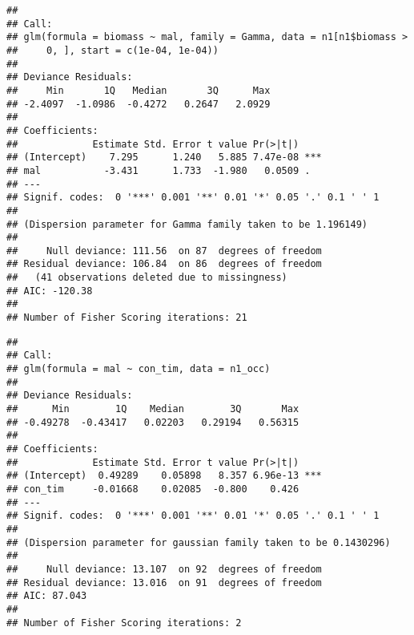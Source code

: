 \documentclass[]{article}
\newenvironment{Shaded}{\begin{snugshade}}{\end{snugshade}}
\newcommand{\KeywordTok}[1]{\textcolor[rgb]{0.13,0.29,0.53}{\textbf{#1}}}
\newcommand{\DataTypeTok}[1]{\textcolor[rgb]{0.13,0.29,0.53}{#1}}
\newcommand{\StringTok}[1]{\textcolor[rgb]{0.31,0.60,0.02}{#1}}
\newcommand{\CommentTok}[1]{\textcolor[rgb]{0.56,0.35,0.01}{\textit{#1}}}
\newcommand{\OperatorTok}[1]{\textcolor[rgb]{0.81,0.36,0.00}{\textbf{#1}}}
\newcommand{\NormalTok}[1]{#1}
\begin{document}
\begin{verbatim}
## 
## Call:
## glm(formula = biomass ~ mal, family = Gamma, data = n1[n1$biomass > 
##     0, ], start = c(1e-04, 1e-04))
## 
## Deviance Residuals: 
##     Min       1Q   Median       3Q      Max  
## -2.4097  -1.0986  -0.4272   0.2647   2.0929  
## 
## Coefficients:
##             Estimate Std. Error t value Pr(>|t|)    
## (Intercept)    7.295      1.240   5.885 7.47e-08 ***
## mal           -3.431      1.733  -1.980   0.0509 .  
## ---
## Signif. codes:  0 '***' 0.001 '**' 0.01 '*' 0.05 '.' 0.1 ' ' 1
## 
## (Dispersion parameter for Gamma family taken to be 1.196149)
## 
##     Null deviance: 111.56  on 87  degrees of freedom
## Residual deviance: 106.84  on 86  degrees of freedom
##   (41 observations deleted due to missingness)
## AIC: -120.38
## 
## Number of Fisher Scoring iterations: 21
\end{verbatim}

\begin{Shaded}
\end{Shaded}

\begin{verbatim}
## 
## Call:
## glm(formula = mal ~ con_tim, data = n1_occ)
## 
## Deviance Residuals: 
##      Min        1Q    Median        3Q       Max  
## -0.49278  -0.43417   0.02203   0.29194   0.56315  
## 
## Coefficients:
##             Estimate Std. Error t value Pr(>|t|)    
## (Intercept)  0.49289    0.05898   8.357 6.96e-13 ***
## con_tim     -0.01668    0.02085  -0.800    0.426    
## ---
## Signif. codes:  0 '***' 0.001 '**' 0.01 '*' 0.05 '.' 0.1 ' ' 1
## 
## (Dispersion parameter for gaussian family taken to be 0.1430296)
## 
##     Null deviance: 13.107  on 92  degrees of freedom
## Residual deviance: 13.016  on 91  degrees of freedom
## AIC: 87.043
## 
## Number of Fisher Scoring iterations: 2
\end{verbatim}
\end{document}
